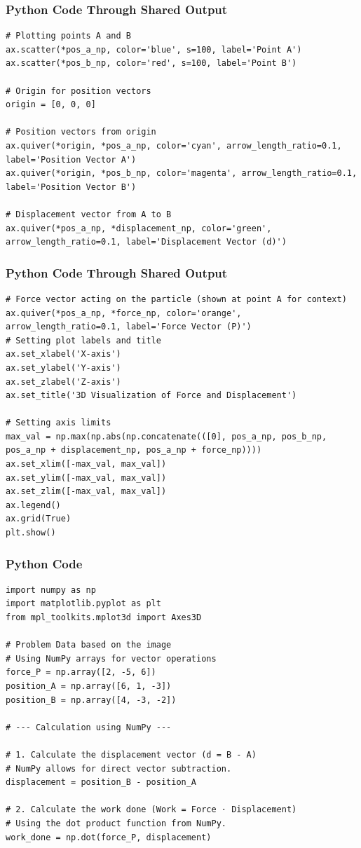 \documentclass{beamer}
\begin{document}
\begin{frame}[fragile]
\frametitle{Python Code Through Shared Output}
\begin{lstlisting}
# Plotting points A and B
ax.scatter(*pos_a_np, color='blue', s=100, label='Point A')
ax.scatter(*pos_b_np, color='red', s=100, label='Point B')

# Origin for position vectors
origin = [0, 0, 0]

# Position vectors from origin
ax.quiver(*origin, *pos_a_np, color='cyan', arrow_length_ratio=0.1, label='Position Vector A')
ax.quiver(*origin, *pos_b_np, color='magenta', arrow_length_ratio=0.1, label='Position Vector B')

# Displacement vector from A to B
ax.quiver(*pos_a_np, *displacement_np, color='green', arrow_length_ratio=0.1, label='Displacement Vector (d)')
\end{lstlisting}
\end{frame}
\begin{frame}[fragile]
\frametitle{Python Code Through Shared Output}
\begin{lstlisting}
# Force vector acting on the particle (shown at point A for context)
ax.quiver(*pos_a_np, *force_np, color='orange', arrow_length_ratio=0.1, label='Force Vector (P)')
# Setting plot labels and title
ax.set_xlabel('X-axis')
ax.set_ylabel('Y-axis')
ax.set_zlabel('Z-axis')
ax.set_title('3D Visualization of Force and Displacement')

# Setting axis limits
max_val = np.max(np.abs(np.concatenate(([0], pos_a_np, pos_b_np, pos_a_np + displacement_np, pos_a_np + force_np))))
ax.set_xlim([-max_val, max_val])
ax.set_ylim([-max_val, max_val])
ax.set_zlim([-max_val, max_val])
ax.legend()
ax.grid(True)
plt.show()
\end{lstlisting}
\end{frame}
\begin{frame}[fragile]
\frametitle{Python Code}
\begin{lstlisting}
import numpy as np
import matplotlib.pyplot as plt
from mpl_toolkits.mplot3d import Axes3D

# Problem Data based on the image
# Using NumPy arrays for vector operations
force_P = np.array([2, -5, 6])
position_A = np.array([6, 1, -3])
position_B = np.array([4, -3, -2])

# --- Calculation using NumPy ---

# 1. Calculate the displacement vector (d = B - A)
# NumPy allows for direct vector subtraction.
displacement = position_B - position_A

# 2. Calculate the work done (Work = Force · Displacement)
# Using the dot product function from NumPy.
work_done = np.dot(force_P, displacement)
\end{lstlisting}
\end{frame}
\end{document}

